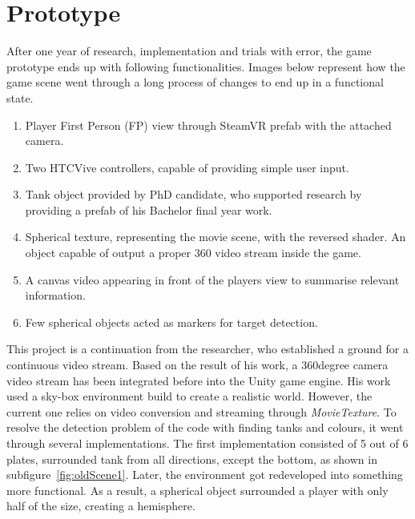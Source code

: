 \section{Prototype}
    After one year of research, implementation and trials with error, the game prototype ends up with following functionalities.
    Images below represent how the game scene went through a long process of changes to end up in a functional state.
	\begin{enumerate}
        \item Player First Person (FP) view through SteamVR prefab with the attached camera.
        \item Two HTCVive controllers, capable of providing simple user input.
        \item Tank object provided by PhD candidate, who supported research by providing a prefab of his Bachelor final year work. 
        \item Spherical texture, representing the movie scene, with the reversed shader.
        An object capable of output a proper 360 video stream inside the game.
        \item A canvas video appearing in front of the players view to summarise relevant information.
        \item Few spherical objects acted as markers for target detection.
    \end{enumerate}
	This project is a continuation from the researcher, who established a ground for a continuous video stream.
    Based on the result of his work, a 360degree camera video stream has been integrated before into the Unity game engine.
    His work used a sky-box environment build to create a realistic world. However, the current one relies on video conversion and streaming through \textit{MovieTexture}.
    To resolve the detection problem of the code with finding tanks and colours, it went through several implementations.
    The first implementation consisted of 5 out of 6 plates, surrounded tank from all directions, except the bottom, as shown in subfigure~\ref{fig:oldScene1}.
    Later, the environment got redeveloped into something more functional.
    As a result, a spherical object surrounded a player with only half of the size, creating a hemisphere.
